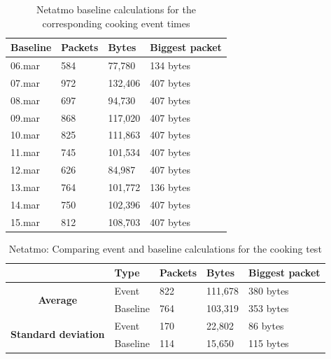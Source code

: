 \begin{table}[!ht]
    \centering
    \caption{Netatmo baseline calculations for the corresponding cooking event times}
    \begin{tabular}{|l|l|l|l|}
    \hline
        \textbf{Baseline} & \textbf{Packets} & \textbf{Bytes} & \textbf{Biggest packet} \\ \hline
        06.mar & 584 & 77,780 & 134 bytes\\ \hline
        07.mar & 972 & 132,406 & 407 bytes\\ \hline
        08.mar & 697 & 94,730 & 407 bytes \\ \hline
        09.mar & 868 & 117,020 & 407 bytes \\ \hline
        10.mar & 825 & 111,863 & 407 bytes \\ \hline
        11.mar & 745 & 101,534 & 407 bytes \\ \hline
        12.mar & 626 & 84,987 & 407 bytes \\ \hline
        13.mar & 764 & 101,772 & 136 bytes \\ \hline
        14.mar & 750 & 102,396 & 407 bytes \\ \hline
        15.mar & 812 & 108,703 & 407 bytes \\ \hline
    \end{tabular}
    \label{tab:NetatmoBaselineCookingCalculations}
\end{table}

\begin{table}[H]
    \centering
    \caption{Netatmo: Comparing event and baseline calculations for the cooking test}
    \begin{tabular}{c|l|l|l|l|}
        \cline{2-5}
        \multicolumn{1}{l|}{}                                              & \textbf{Type} & \textbf{Packets} & \textbf{Bytes} & \textbf{Biggest packet} \\ \hline
        \multicolumn{1}{|c|}{\multirow{2}{*}{\textbf{Average}}}            & Event         & 822              & 111,678        & 380 bytes               \\ \cline{2-5} 
        \multicolumn{1}{|c|}{}                                             & Baseline      & 764              & 103,319        & 353 bytes                \\ \hline
        \multicolumn{1}{|c|}{\multirow{2}{*}{\textbf{Standard deviation}}} & Event         & 170              & 22,802         & 86 bytes                 \\ \cline{2-5} 
        \multicolumn{1}{|c|}{}                                             & Baseline      & 114              & 15,650         & 115 bytes               \\ \hline          
    \end{tabular}
    \label{tab:NetatmoComparingBaselineAndCookingCalculations}
\end{table}

